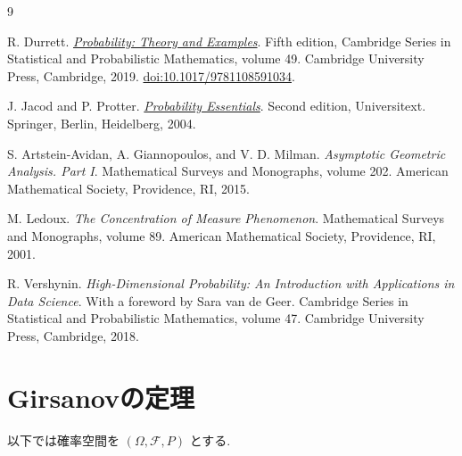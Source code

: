 \documentclass[11pt]{article}
\theoremstyle{breakstyle}
\begin{document}
\begin{thebibliography}{9}

R. Durrett.
\newblock
\href{https://www.cambridge.org/core/books/probability/DD9A1907F810BB14CCFF022CDFC5677A}
{\emph{Probability: Theory and Examples}}.
\newblock Fifth edition, Cambridge Series in Statistical and Probabilistic
Mathematics, volume 49. Cambridge University Press, Cambridge, 2019.
\newblock \href{https://doi.org/10.1017/9781108591034}
{doi:10.1017/9781108591034}.

J. Jacod and P. Protter.
\newblock
\href{https://doi.org/10.1007/978-3-642-55682-1}
{\emph{Probability Essentials}}.
\newblock Second edition, Universitext. Springer, Berlin, Heidelberg, 2004.

S. Artstein-Avidan, A. Giannopoulos, and V. D. Milman.
\newblock \emph{Asymptotic Geometric Analysis. Part I}.
\newblock Mathematical Surveys and Monographs, volume 202.
American Mathematical Society, Providence, RI, 2015.

M. Ledoux.
\newblock \emph{The Concentration of Measure Phenomenon}.
\newblock Mathematical Surveys and Monographs, volume 89.
American Mathematical Society, Providence, RI, 2001.

R. Vershynin.
\newblock \emph{High-Dimensional Probability: An Introduction with Applications in Data Science}.
\newblock With a foreword by Sara van de Geer.
Cambridge Series in Statistical and Probabilistic Mathematics, volume 47.
Cambridge University Press, Cambridge, 2018.

\end{thebibliography}

\clearpage
\appendix
\section{Girsanovの定理}
\label{app:girsanov}
以下では確率空間を $(\Omega,\mathcal{F},P)$ とする.
\end{document}
